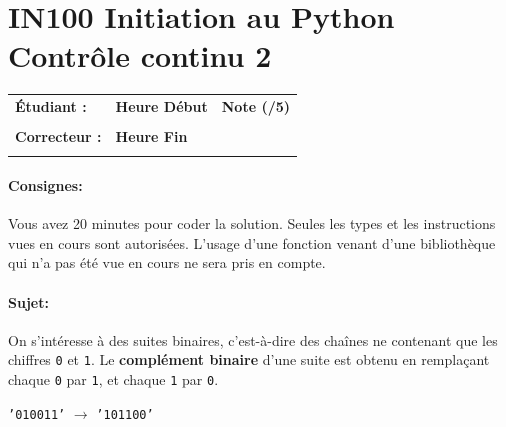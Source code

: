 \documentclass[a4paper,11pt]{article}
\begin{document}
\newtheorem{theo}{Theorem}
\newtheorem{coro}{Corollary}[theo]
\newtheorem{lemme}{Lemma}
\renewcommand{\thecoro}{\thetheo.\arabic{coro}}



\parindent=0cm


\section*{\center IN100 Initiation au Python\\
Contrôle continu 2}

\vspace{-0.2 cm}

\begin{table}[h!]
\centering
\renewcommand{\arraystretch}{1.4} %
\begin{tabular}{|p{10cm}|p{3cm}|p{2cm}|}
\hline
\textbf{Étudiant :} & \textbf{Heure Début }  & \textbf{Note (/5) }  \\
& & \\
\hline
\textbf{Correcteur :} & \textbf{Heure Fin } & \\
& & \\
\hline

\hline
\end{tabular}
\end{table}
\vspace{-0.4 cm}


\paragraph*{Consignes:} Vous avez 20 minutes pour coder la solution. Seules les types et les instructions vues en cours sont autorisées. L'usage d'une fonction 
venant d'une bibliothèque qui n'a pas été vue en cours ne sera pris en compte. 

\vspace{-0.4 cm}

\paragraph*{Sujet:} On s’intéresse à des suites binaires, c’est-à-dire des chaînes ne contenant que les chiffres \texttt{0} et \texttt{1}.  
Le \textbf{complément binaire} d’une suite est obtenu en remplaçant chaque \texttt{0} par \texttt{1}, et chaque \texttt{1} par \texttt{0}.
\vspace{-0.3 cm}
\begin{center}
\texttt{'010011'} $\longrightarrow$ \texttt{'101100'}
\end{center}
\vspace{-0.3 cm}
\end{document}
